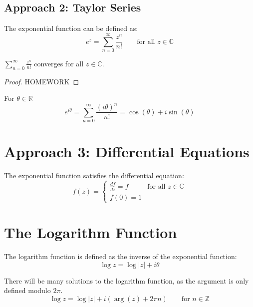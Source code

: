 \subsection*{Approach 2: Taylor Series}

\begin{definition}
    The exponential function can be defined as:
    \begin{equation}
        e^z = \sum_{n=0}^{\infty} \frac{z^n}{n!} \qquad \text{for all } z \in \mathbb{C}
    \end{equation}
\end{definition}

\begin{claim}
    $\sum_{n=0}^{\infty} \frac{z^n}{n!}$ converges for all $z \in \mathbb{C}$.
\end{claim}
\begin{proof}
    HOMEWORK
\end{proof}

\begin{problem}
For $\theta \in \mathbb{R}$
\[
    e^{i\theta} = \sum_{n=0}^{\infty} \frac{(i\theta)^n}{n!} = \cos(\theta) + i \sin(\theta)
\]
\end{problem}

\section{Approach 3: Differential Equations}
\begin{definition}
    The exponential function satisfies the differential equation:
    \begin{equation}
        f(z) = \begin{cases}
            \frac{df}{dz} = f & \text{for all } z \in \mathbb{C} \\
            f(0) = 1
        \end{cases}
    \end{equation}
\end{definition}

\section{The Logarithm Function}
\begin{definition}
    The logarithm function is defined as the inverse of the exponential function:
    \begin{equation}
        \log z = \log |z| + i \theta
    \end{equation}
\end{definition}
\begin{remark}
    There will be many solutions to the logarithm function, as the argument is only defined modulo \(2\pi\).
    \[
        \log z = \log |z| + i \left( \arg(z) + 2\pi n \right) \qquad \text{for } n \in \mathbb{Z}
    \]
\end{remark}

